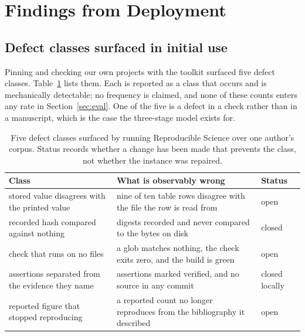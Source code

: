 \documentclass{article}
\begin{document}
\section{Findings from Deployment}
\label{sec:failures}

\subsection{Defect classes surfaced in initial use}

Pinning and checking our own projects with the toolkit surfaced five defect classes.
Table~\ref{tab:defects} lists them. Each is reported as a class that occurs and is mechanically
detectable; no frequency is claimed, and none of these counts enters any rate in
Section~\ref{sec:eval}. One of the five is a defect in a check rather than in a manuscript, which
is the case the three-stage model exists for.

\begin{table}[h]
\centering
\small
\caption{Five defect classes surfaced by running Reproducible Science over one author's corpus. Status
records whether a change has been made that prevents the class, not whether the instance was
repaired.}
\label{tab:defects}
\begin{tabular}{@{}>{\raggedright\arraybackslash}p{}>{\raggedright\arraybackslash}p{}>{\raggedright\arraybackslash}p{}@{}}
\toprule
\textbf{Class} & \textbf{What is observably wrong} & \textbf{Status} \\
\midrule
stored value disagrees with the printed value & nine of ten table rows disagree with the file the row is read from & open \\
recorded hash compared against nothing & digests recorded and never compared to the bytes on disk & closed \\
check that runs on no files & a glob matches nothing, the check exits zero, and the build is green & open \\
assertions separated from the evidence they name & 178 assertions marked verified, and no source in any commit & closed locally \\
reported figure that stopped reproducing & a reported count no longer reproduces from the bibliography it described & open \\
\bottomrule
\end{tabular}
\end{table}
\end{document}
